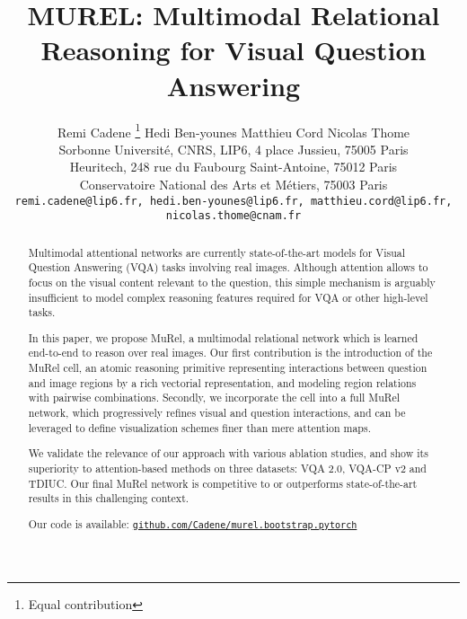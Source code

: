 \documentclass[10pt,twocolumn,letterpaper]{article}
\begin{document}
\newcommand{\cmark}{\ding{51}}\newcommand{\xmark}{\ding{55}}


\newcommand{\MCc}[1]{\textcolor{blue}{[Matt: #1]}}
\newcommand{\MC}[1]{{\color{blue}#1}}
\newcommand{\HB}[1]{{\color{red}#1}}

\title{MUREL: Multimodal Relational Reasoning for Visual Question Answering}

\author{Remi Cadene \thanks{Equal contribution}
\qquad 
Hedi Ben-younes \footnotemark[1] 
\qquad  
Matthieu Cord   
\qquad 
Nicolas Thome  
\\  Sorbonne Universit\'e, CNRS, LIP6, 4 place Jussieu, 75005 Paris
\\  Heuritech, 248 rue du Faubourg Saint-Antoine, 75012 Paris 
\\  Conservatoire National des Arts et M\'etiers, 75003 Paris
\\  {\tt\small remi.cadene@lip6.fr,
hedi.ben-younes@lip6.fr,
matthieu.cord@lip6.fr, nicolas.thome@cnam.fr}
}

\maketitle


\begin{abstract}


Multimodal attentional networks are currently state-of-the-art models for Visual Question Answering (VQA) tasks involving real images. Although attention allows to focus on the visual content relevant to the question, this simple mechanism is arguably insufficient to model complex reasoning features required for VQA or other high-level tasks. 

In this paper, we propose MuRel, a multimodal relational network which is learned end-to-end to reason over real images. Our first contribution is the introduction of the MuRel cell, an atomic reasoning primitive representing interactions between question and image regions by a rich vectorial representation, and modeling region relations with pairwise combinations.
Secondly, we incorporate the cell into a full MuRel network, which progressively refines visual and question interactions, and can be leveraged to define visualization schemes finer than mere attention maps. 

We validate the relevance of our approach with various ablation studies, and show its superiority to attention-based methods on three datasets: VQA 2.0, VQA-CP v2 and TDIUC. Our final MuRel network is competitive to or outperforms state-of-the-art results in this challenging context.

Our code is available: \href{https://github.com/Cadene/murel.bootstrap.pytorch}{\texttt{github.com/Cadene/\linebreak murel.bootstrap.pytorch}}
\end{abstract}
\end{document}
